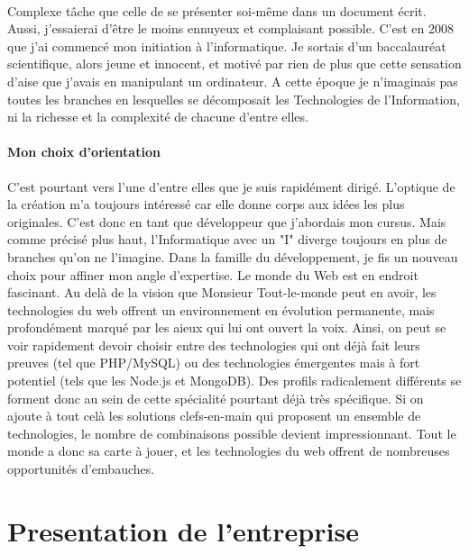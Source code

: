 \documentclass[12pt,a4paper,article]{memoir} %
\begin{document}
\paragraph{}
Complexe tâche que celle de se présenter soi-même dans un document écrit. Aussi, j'essaierai d'être le moins ennuyeux et complaisant possible. 
C'est en 2008 que j'ai commencé mon initiation à l'informatique. Je sortais d'un baccalauréat scientifique, alors jeune et innocent, et motivé par rien de plus que cette sensation d'aise que j'avais en manipulant un ordinateur. A cette époque je n'imaginais pas toutes les branches en lesquelles se décomposait les Technologies de l'Information, ni la richesse et la complexité de chacune d'entre elles. 

\paragraph{Mon choix d'orientation \\}
C'est pourtant vers l'une d'entre elles que je suis rapidément dirigé. L'optique de la création m'a toujours intéressé car elle donne corps aux idées les plus originales. C'est donc en tant que développeur que j'abordais mon cursus. 
Mais comme précisé plus haut, l'Informatique avec un "I" diverge toujours en plus de branches qu'on ne l'imagine. Dans la famille du développement, je fis un nouveau choix pour affiner mon angle d'expertise. 
Le monde du Web est en endroit fascinant. Au delà de la vision que Monsieur Tout-le-monde peut en avoir, les technologies du web offrent un environnement en évolution permanente, mais profondément marqué par les aieux qui lui ont ouvert la voix. Ainsi, on peut se voir rapidement devoir choisir entre des technologies qui ont déjà fait leurs preuves (tel que PHP/MySQL) ou des technologies émergentes mais à fort potentiel (tels que les Node.js et MongoDB). Des profils radicalement différents se forment donc au sein de cette spécialité pourtant déjà très spécifique. Si on ajoute à tout celà les solutions clefs-en-main qui proposent un ensemble de technologies, le nombre de combinaisons possible devient impressionnant.
Tout le monde a donc sa carte à jouer, et les technologies du web offrent de nombreuses opportunités d'embauches. 


\section{Presentation de l'entreprise}

\paragraph{} \lipsum
\end{document}
